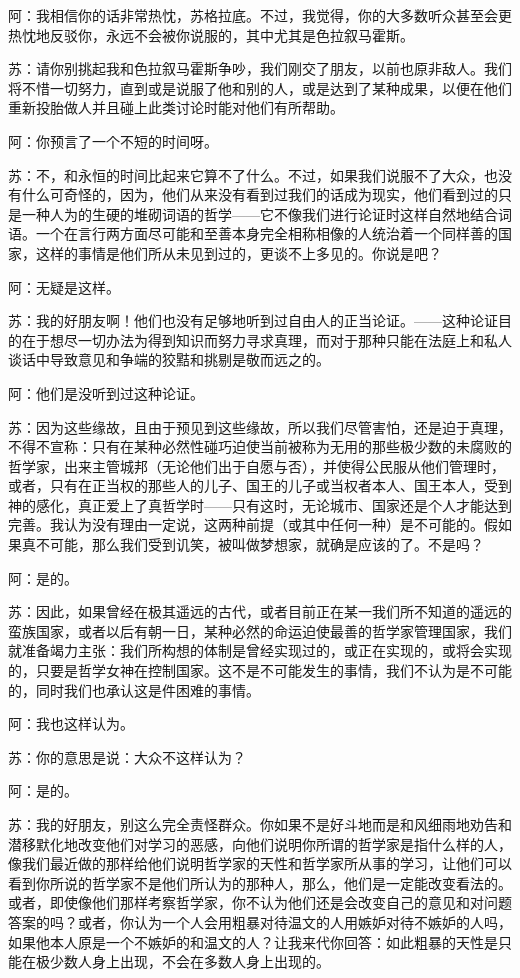 \documentclass[12pt,oneside]{book}
\begin{document}
阿：我相信你的话非常热忱，苏格拉底。不过，我觉得，你的大多数听众甚至会更热忱地反驳你，永远不会被你说服的，其中尤其是色拉叙马霍斯。

苏：请你别挑起我和色拉叙马霍斯争吵，我们刚交了朋友，以前也原非敌人。我们将不惜一切努力，直到或是说服了他和别的人，或是达到了某种成果，以便在他们重新投胎做人并且碰上此类讨论时能对他们有所帮助。

阿：你预言了一个不短的时间呀。

苏：不，和永恒的时间比起来它算不了什么。不过，如果我们说服不了大众，也没有什么可奇怪的，因为，他们从来没有看到过我们的话成为现实，他们看到过的只是一种人为的生硬的堆砌词语的哲学——它不像我们进行论证时这样自然地结合词语。一个在言行两方面尽可能和至善本身完全相称相像的人统治着一个同样善的国家，这样的事情是他们所从未见到过的，更谈不上多见的。你说是吧？

阿：无疑是这样。

苏：我的好朋友啊！他们也没有足够地听到过自由人的正当论证。——这种论证目的在于想尽一切办法为得到知识而努力寻求真理，而对于那种只能在法庭上和私人谈话中导致意见和争端的狡黠和挑剔是敬而远之的。

阿：他们是没听到过这种论证。

苏：因为这些缘故，且由于预见到这些缘故，所以我们尽管害怕，还是迫于真理，不得不宣称：只有在某种必然性碰巧迫使当前被称为无用的那些极少数的未腐败的哲学家，出来主管城邦（无论他们出于自愿与否），并使得公民服从他们管理时，或者，只有在正当权的那些人的儿子、国王的儿子或当权者本人、国王本人，受到神的感化，真正爱上了真哲学时——只有这时，无论城市、国家还是个人才能达到完善。我认为没有理由一定说，这两种前提（或其中任何一种）是不可能的。假如果真不可能，那么我们受到讥笑，被叫做梦想家，就确是应该的了。不是吗？

阿：是的。

苏：因此，如果曾经在极其遥远的古代，或者目前正在某一我们所不知道的遥远的蛮族国家，或者以后有朝一日，某种必然的命运迫使最善的哲学家管理国家，我们就准备竭力主张：我们所构想的体制是曾经实现过的，或正在实现的，或将会实现的，只要是哲学女神在控制国家。这不是不可能发生的事情，我们不认为是不可能的，同时我们也承认这是件困难的事情。

阿：我也这样认为。

苏：你的意思是说：大众不这样认为？

阿：是的。

苏：我的好朋友，别这么完全责怪群众。你如果不是好斗地而是和风细雨地劝告和潜移默化地改变他们对学习的恶感，向他们说明你所谓的哲学家是指什么样的人，像我们最近做的那样给他们说明哲学家的天性和哲学家所从事的学习，让他们可以看到你所说的哲学家不是他们所认为的那种人，那么，他们是一定能改变看法的。或者，即使像他们那样考察哲学家，你不认为他们还是会改变自己的意见和对问题答案的吗？或者，你认为一个人会用粗暴对待温文的人用嫉妒对待不嫉妒的人吗，如果他本人原是一个不嫉妒的和温文的人？让我来代你回答：如此粗暴的天性是只能在极少数人身上出现，不会在多数人身上出现的。
\end{document}
